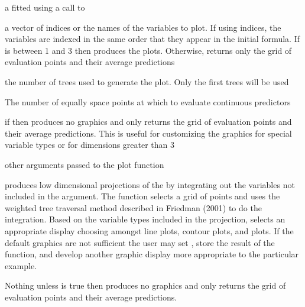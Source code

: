 \documentclass[a4paper]{book}
\begin{document}
\begin{Arguments}
\begin{ldescription}
\item[\code{x}]  a  fitted using a call to 
\item[\code{i.var}] a vector of indices or the names of the variables to plot. If
using indices, the variables are indexed in the same order that they appear
in the initial  formula.
If  is between 1 and 3 then  produces the plots. Otherwise,
 returns only the grid of evaluation points and their average predictions
\item[\code{n.trees}]  the number of trees used to generate the plot. Only the first
 trees will be used
\item[\code{continuous.resolution}]  The number of equally space points at which to
evaluate continuous predictors 
\item[\code{return.grid}]  if  then  produces no graphics and only returns
the grid of evaluation points and their average predictions. This is useful for
customizing the graphics for special variable types or for dimensions greater
than 3 
\item[\code{...}]  other arguments passed to the plot function 
\end{ldescription}
\end{Arguments}
%
\begin{Details}\relax
{} produces low dimensional projections of the
 by integrating out the variables not included in the
 argument. The function selects a grid of points and uses the
weighted tree traversal method described in Friedman (2001) to do the
integration. Based on the variable types included in the projection,
 selects an appropriate display choosing amongst line plots,
contour plots, and  plots. If the default graphics
are not sufficient the user may set , store the result
of the function, and develop another graphic display more appropriate to the
particular example.
\end{Details}
%
\begin{Value}
Nothing unless  is true then  produces no
graphics and only returns the grid of evaluation points and their average
predictions.
\end{Value}
\end{document}
